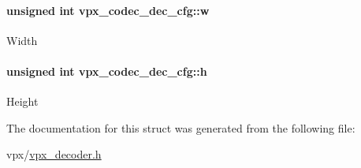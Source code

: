 \paragraph[{\texorpdfstring{w}{w}}]{\setlength{\rightskip}{0pt plus 5cm}unsigned int vpx\+\_\+codec\+\_\+dec\+\_\+cfg\+::w}\hypertarget{structvpx__codec__dec__cfg_acf188f8a7e6c8e1d1a7f488a76f9da42}{}\label{structvpx__codec__dec__cfg_acf188f8a7e6c8e1d1a7f488a76f9da42}
Width 
\paragraph[{\texorpdfstring{h}{h}}]{\setlength{\rightskip}{0pt plus 5cm}unsigned int vpx\+\_\+codec\+\_\+dec\+\_\+cfg\+::h}\hypertarget{structvpx__codec__dec__cfg_a45311c284e8371d58eb403437db5f2f9}{}\label{structvpx__codec__dec__cfg_a45311c284e8371d58eb403437db5f2f9}
Height 

The documentation for this struct was generated from the following file\+:\begin{DoxyCompactItemize}
\item 
vpx/\hyperlink{vpx__decoder_8h}{vpx\+\_\+decoder.\+h}\end{DoxyCompactItemize}
